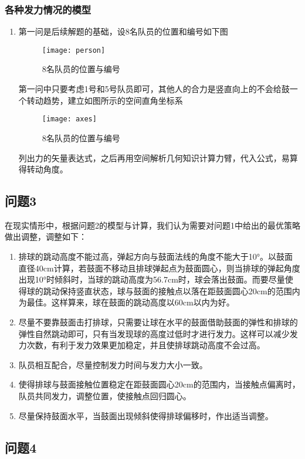 \documentclass{cumcmthesis}
\begin{document}
\subsubsection{各种发力情况的模型}
\begin{enumerate}
\item 第一问是后续解题的基础，设8名队员的位置和编号如下图
\begin{figure}[!h]
    \centering
    \texttt{[image: person]}
    \caption{8名队员的位置与编号}
    \label{fig:p2}
\end{figure}
第一问中只要考虑1号和5号队员即可，其他人的合力是竖直向上的不会给鼓一个转动趋势，建立如图所示的空间直角坐标系
\begin{figure}[!h]
    \centering
    \texttt{[image: axes]}
    \caption{8名队员的位置与编号}
    \label{fig:p3}
\end{figure}
列出力的矢量表达式，之后再用空间解析几何知识计算力臂，代入公式，易算得转动角度。
\end{enumerate}

\subsection{问题3}

在现实情形中，根据问题2的模型与计算，我们认为需要对问题1中给出的最优策略做出调整，调整如下：
\begin{enumerate}
\item 排球的跳动高度不能过高，弹起方向与鼓面法线的角度不能大于10°。以鼓面直径40cm计算，若鼓面不移动且排球弹起点为鼓面圆心，则当排球的弹起角度出现10°时倾斜时，当球的跳动高度为56.7cm时，球会落出鼓面。而要尽量使得球的跳动保持竖直状态，球与鼓面的接触点以落在距鼓面圆心20cm的范围内为最佳。这样算来，球在鼓面的跳动高度以60cm以内为好。
\item 尽量不要靠鼓面击打排球，只需要让球在水平的鼓面借助鼓面的弹性和排球的弹性自然跳动即可，只有当发现球的高度过低时才进行发力。这样可以减少发力次数，有利于发力效果更加稳定，并且使排球跳动高度不会过高。
\item 队员相互配合，尽量控制发力时间与发力大小一致。
\item 使得排球与鼓面接触位置稳定在距鼓面圆心20cm的范围内，当接触点偏离时，队员共同发力，调整位置，使接触点回归圆心。
\item 尽量保持鼓面水平，当鼓面出现倾斜使得排球偏移时，作出适当调整。
\end{enumerate}

\subsection{问题4}
\end{document}
